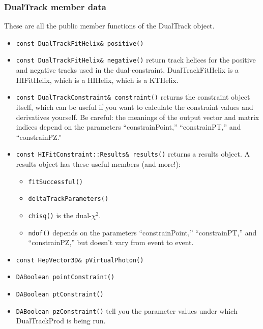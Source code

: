 \documentclass[12pt]{article}
\begin{document}
\subsubsection{DualTrack member data}

These are all the public member functions of the DualTrack object.

\begin{itemize}

  \item {\tt const DualTrackFitHelix\& positive()}
  \item {\tt const DualTrackFitHelix\& negative()} return track
  helices for the positive and negative tracks used in the
  dual-constraint.  DualTrackFitHelix is a HIFitHelix, which is a
  HIHelix, which is a KTHelix.

  \item {\tt const DualTrackConstraint\& constraint()} returns the
  constraint object itself, which can be useful if you want to
  calculate the constraint values and derivatives yourself.  Be
  careful: the meanings of the output vector and matrix indices depend
  on the parameters ``constrainPoint,'' ``constrainPT,'' and
  ``constrainPZ.''

  \item {\tt const HIFitConstraint::Results\& results()} returns a
  results object.  A results object has these useful members (and
  more!):
  \begin{itemize}

    \item {\tt fitSuccessful()}

    \item {\tt deltaTrackParameters()}

    \item {\tt chisq()} is the dual-$\chi^2$.

    \item {\tt ndof()} depends on the parameters ``constrainPoint,''
    ``constrainPT,'' and ``constrainPZ,'' but doesn't vary from event
    to event.

  \end{itemize}

  \item {\tt const HepVector3D\& pVirtualPhoton()}
  \item {\tt DABoolean pointConstraint()}
  \item {\tt DABoolean ptConstraint()}
  \item {\tt DABoolean pzConstraint()} tell you the parameter values
  under which DualTrackProd is being run.

\end{itemize}
\end{document}
